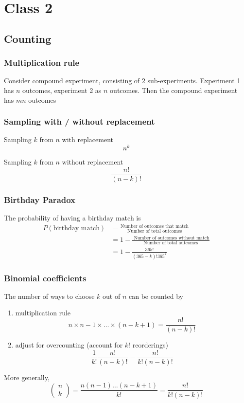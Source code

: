 \chapter{Class 2}

\section{Counting}

\subsection{Multiplication rule}
\begin{framed}
   Consider compound experiment, consisting of $2$ sub-experiments. Experiment 1 has $n$ outcomes, experiment 2 as $n$ outcomes. Then the compound experiment has $mn$ outcomes
\end{framed}

\subsection{Sampling with / without replacement}

Sampling $k$ from $n$ with replacement
\[
  n^k
\] 

Sampling $k$ from $n$ without replacement
\[
  \frac{n!}{(n-k)!}
\] 

\subsection{Birthday Paradox}

The probability of having a birthday match is
\begin{align*}
   P(\text{birthday match}) &= \frac{\text{Number of outcomes that match}}{ \text{Number of total outcomes}} \\
                            &= 1 - \frac{ \text{ Number of outcomes without match}}{ \text{Number of total outcomes}} \\
                            &= 1 - \frac{365!}{(365 - k)! 365^k}
\end{align*}


\subsection{Binomial coefficients}
The number of ways to choose $k$ out of $n$ can be counted by
\begin{enumerate}
   \item multiplication rule 
      \[
        n \times n -1 \times \hdots \times (n - k+1) = \frac{n!}{(n-k)!}
      \] 
   \item adjust for overcounting (account for $k!$ reorderings)
      \[
         \frac{1}{k!} \frac{n!}{(n-k)!} = \frac{n!}{k!(n-k)!}
      \] 
\end{enumerate}
More generally, 
\[
  \begin{pmatrix} n \\ k \end{pmatrix}  = \frac{n (n-1) \hdots (n - k + 1)}{k!} = \frac{n!}{k! (n-k)!}
\] 


